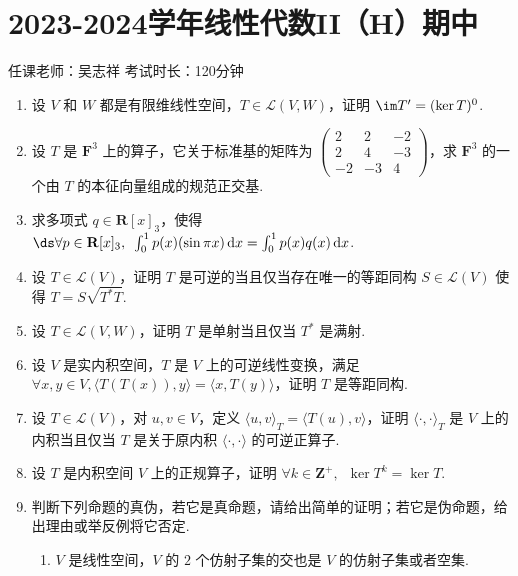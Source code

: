 \section{2023-2024学年线性代数II（H）期中}

\begin{center}
    任课老师：吴志祥\hspace{4em} 考试时长：120分钟
\end{center}

\begin{enumerate}
    \item 设 $V$ 和 $W$ 都是有限维线性空间，$T \in \mathcal{L}(V, W)$，证明 $\im T' = (\ker T)^{0}$.

    \item 设 $T$ 是 $\mathbf{F}^3$ 上的算子，它关于标准基的矩阵为 $\begin{pmatrix}
        2 & 2 & -2 \\ 2 & 4 & -3 \\ -2 & -3 & 4
    \end{pmatrix}$，求 $\mathbf{F}^3$ 的一个由 $T$ 的本征向量组成的规范正交基.

    \item 求多项式 $q \in \mathbf{R}[x]_3$，使得 $\ds\forall p \in \mathbf{R}[x]_3,\enspace \int_{0}^{1}p(x)(\sin \pi x)\,\mathrm{d}x = \int_{0}^{1}p(x)q(x)\,\mathrm{d}x$.

    \item 设 $T \in \mathcal{L}(V)$，证明 $T$ 是可逆的当且仅当存在唯一的等距同构 $S \in \mathcal{L}(V)$ 使得 $T = S \sqrt{T^{*}T}$.

    \item 设 $T \in \mathcal{L}(V, W)$，证明 $T$ 是单射当且仅当 $T^{*}$ 是满射.

    \item 设 $V$ 是实内积空间，$T$ 是 $V$ 上的可逆线性变换，满足 $\forall x, y \in V, \langle T(T(x)), y \rangle = \langle x, T(y) \rangle$，证明 $T$ 是等距同构.

    \item 设 $T \in \mathcal{L}(V)$，对 $u, v \in V$，定义 $\langle u, v \rangle_{T} = \langle T(u), v \rangle$，证明 $\langle \cdot, \cdot \rangle_{T}$ 是 $V$ 上的内积当且仅当 $T$ 是关于原内积 $\langle \cdot, \cdot \rangle$ 的可逆正算子.

    \item 设 $T$ 是内积空间 $V$ 上的正规算子，证明 $\forall k \in \mathbf{Z}^{+},\enspace \ker T^{k} = \ker T$.

    \item 判断下列命题的真伪，若它是真命题，请给出简单的证明；若它是伪命题，给出理由或举反例将它否定.
    \begin{enumerate}
        \item $V$ 是线性空间，$V$ 的 $2$ 个仿射子集的交也是 $V$ 的仿射子集或者空集.


\end{enumerate}
\end{enumerate}
